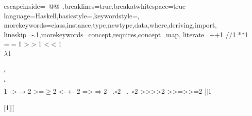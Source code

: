 \providecommand{\pytinl}[2][\small] %
{{\lstinline[language=Pythoncustom,breaklines=false,columns=fullflexible,%
basicstyle=\color{lightblue}#1\ttfamily%
,keywordstyle=#1\ttfamily]@#2@}}%

%

\providecommand{\cplusinput}[3][\footnotesize]{{}}

{%
escapeinside={--@}{@--},breaklines=true,breakatwhitespace=true%
language=Haskell,basicstyle=\color{lightblue}\ttfamily,keywordstyle=\ttfamily,%
morekeywords={class,instance,type,newtype,data,where,deriving,import},%
lineskip=-.1\baselineskip,morekeywords={concept,requires,concept_map},
literate={+}{{$+$}}1 {/}{{$/$}}1 {*}{{$*$}}1 {=}{{$=$}}1
               {>}{{$>$}}1 {<}{{$<$}}1 {\\}{{$\lambda$}}1
               {\\\\}{{\char`\\\char`\\}}1
               {->}{{$\rightarrow$}}2 {>=}{{$\geq$}}2 {<-}{{$\leftarrow$}}2
               {=>}{{$\Rightarrow$}}2
               {\ .}{{$\circ$}}2 {\ .\ }{{$\circ$}}2
               {>>}{{>>}}2 {>>=}{{>>=}}2
               {|}{{$\mid$}}1
             }

[1][\small]{}{}

\providecommand{\haskellinl}[2][\normalsize]{{\lstinline[language=Haskell-custom, columns=fullflexible%
basicstyle=\color{lightblue}#1\ttfamily,keywordstyle=#1\ttfamily]@#2@}}%

\providecommand{\haskinl}[2][\normalsize]{{\lstinline[language=Haskell-custom,columns=fullflexible,%
basicstyle=\color{lightblue}#1\ttfamily,mathescape=true,keywordstyle=#1\ttfamily]@#2@}}%

%

\providecommand{\haskin}[3][\footnotesize]{{}}

